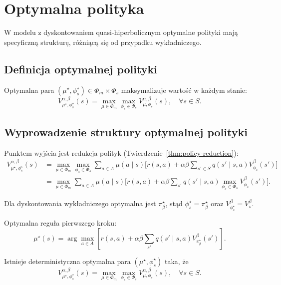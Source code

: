 \section{Optymalna polityka}

W modelu z dyskontowaniem quasi-hiperbolicznym optymalne polityki mają specyficzną strukturę, różniącą się od przypadku wykładniczego. 

\subsection{Definicja optymalnej polityki}

Optymalna para $(\mu^\star, \phi_s^\star) \in \Phi_m \times \Phi_s$ maksymalizuje wartość w każdym stanie:
\begin{equation}
V^{\alpha, \beta}_{\mu^\star, \phi_s^\star}(s) = \max_{\mu \in \Phi_m} \max_{\phi_s \in \Phi_s} V^{\alpha, \beta}_{\mu, \phi_s}(s), \quad \forall s \in S.
\end{equation}

\subsection{Wyprowadzenie struktury optymalnej polityki}

Punktem wyjścia jest redukcja polityk (Twierdzenie~\ref{thm:policy-reduction}):
\begin{align}
V^{\alpha, \beta}_{\mu^\star, \phi_s^\star}(s) &= \max_{\mu \in \Phi_m} \max_{\phi_s \in \Phi_s} \sum_{a \in A} \mu(a\mid s) \Big[ r(s, a) + \alpha \beta \sum_{s' \in S} q(s'\mid s, a) V^{\beta}_{\phi_s}(s') \Big] \nonumber \\
&= \max_{\mu \in \Phi_m} \sum_{a \in A} \mu(a\mid s) \Big[ r(s, a) + \alpha \beta \sum_{s'} q(s'\mid s, a) \max_{\phi_s \in \Phi_s} V^{\beta}_{\phi_s}(s') \Big].
\end{align}

Dla dyskontowania wykładniczego optymalna jest $\pi_\beta^\star$, stąd $\phi_s^\star = \pi_\beta^\star$ oraz $V^{\beta}_{\phi_s^\star} = V^{\beta}_\star$.

Optymalna reguła pierwszego kroku:
\begin{equation}
\mu^\star(s) = \arg\max_{a \in A} \left[ r(s, a) + \alpha \beta \sum_{s'} q(s'\mid s, a) V^{\beta}_{\pi^\star_\beta}(s') \right].
\end{equation}

\begin{theorem}
\label{thm:deterministic-optimal}
Istnieje deterministyczna optymalna para $(\mu^\star, \phi_s^\star)$ taka, że
\begin{equation}
V^{\alpha, \beta}_{\mu^\star, \phi_s^\star}(s) = \max_{\mu \in \Phi_m} \max_{\phi_s \in \Phi_s} V^{\alpha, \beta}_{\mu, \phi_s}(s), \quad \forall s \in S.
\end{equation}
\end{theorem}

